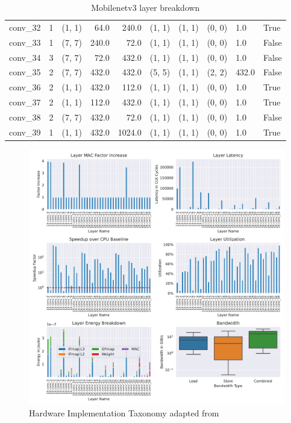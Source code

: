\begin{center}
\begin{table}[]
\begin{tabular}{lrlrrlllll}
        conv\_32 &      1 &      (1, 1) &   64.0 &   240.0 &  (1, 1) &  (1, 1) &  (0, 0) &    1.0 &   True \\
        conv\_33 &      1 &      (7, 7) &  240.0 &    72.0 &  (1, 1) &  (1, 1) &  (0, 0) &    1.0 &  False \\
        conv\_34 &      3 &      (7, 7) &   72.0 &   432.0 &  (1, 1) &  (1, 1) &  (0, 0) &    1.0 &  False \\
        conv\_35 &      2 &      (7, 7) &  432.0 &   432.0 &  (5, 5) &  (1, 1) &  (2, 2) &  432.0 &  False \\
        conv\_36 &      2 &      (1, 1) &  432.0 &   112.0 &  (1, 1) &  (1, 1) &  (0, 0) &    1.0 &   True \\
        conv\_37 &      2 &      (1, 1) &  112.0 &   432.0 &  (1, 1) &  (1, 1) &  (0, 0) &    1.0 &   True \\
        conv\_38 &      2 &      (7, 7) &  432.0 &    72.0 &  (1, 1) &  (1, 1) &  (0, 0) &    1.0 &  False \\
        conv\_39 &      1 &      (1, 1) &  432.0 &  1024.0 &  (1, 1) &  (1, 1) &  (0, 0) &    1.0 &   True \\
        \bottomrule
        \end{tabular}
        \caption{Mobilenetv3 layer breakdown}
        \label{tab:mobilenetv3_layer_breakdown}
    \end{table}
\end{center}


\begin{figure}[ht]
    \centering
    \includegraphics[scale=0.5]{Plots/networks/mobilenetv3_small_075.pdf}
    \caption{Hardware Implementation Taxonomy adapted from \cite{maestro}}
    \label{fig:mobilenetv3_metrics}
\end{figure}



